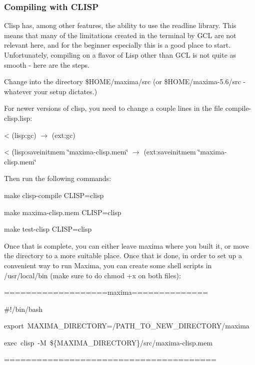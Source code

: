 \subsubsection{Compiling with CLISP}

Clisp has, among other features, the ability to use the readline library.
This means that many of the limitations created in the terminal by
GCL are not relevant here, and for the beginner especially this is
a good place to start. Unfortunately, compiling on a flavor of Lisp
other than GCL is not quite as smooth - here are the steps. 

Change into the directory \$HOME/maxima/src (or \$HOME/maxima-5.6/src
- whatever your setup dictates.)

For newer versions of clisp, you need to change a couple lines in
the file compile-clisp.lisp:

\vspace{3ex}

< (lisp:gc) \( \rightarrow  \) (ext:gc)

< (lisp:saveinitmem \char`\"{}maxima-clisp.mem\char`\"{} \( \rightarrow  \)
(ext:saveinitmem \char`\"{}maxima-clisp.mem\char`\"{}

\vspace{3ex}

Then run the following commands:

\vspace{3ex}

make clisp-compile CLISP=clisp

make maxima-clisp.mem CLISP=clisp

make test-clisp CLISP=clisp

\vspace{3ex}

Once that is complete, you can either leave maxima where you built
it, or move the directory to a more suitable place. Once that is done,
in order to set up a convenient way to run Maxima, you can create
some shell scripts in /usr/local/bin (make sure to do chmod +x on
both files):

\vspace{3ex}

===================maxima==============

\#!/bin/bash

export~MAXIMA\_DIRECTORY=/PATH\_TO\_NEW\_DIRECTORY/maxima

exec~clisp~-M~\$\{MAXIMA\_DIRECTORY\}/src/maxima-clisp.mem 

=======================================

